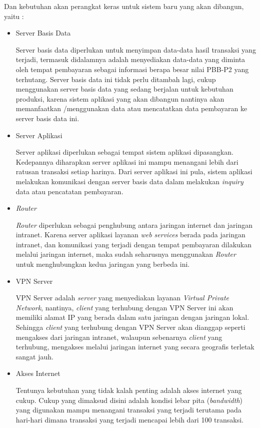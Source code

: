 \documentclass[pdftex, 12pt, oneside]{article}
\begin{document}
Dan kebutuhan akan perangkat keras untuk sistem baru yang akan dibangun, yaitu :

\begin{itemize}
  \item Server Basis Data
  
  Server basis data diperlukan untuk menyimpan data-data hasil transaksi yang terjadi, termasuk didalamnya adalah menyediakan data-data yang diminta oleh tempat pembayaran sebagai informasi berapa besar nilai PBB-P2 yang terhutang. Server basis data ini tidak perlu ditambah lagi, cukup menggunakan server basis data yang sedang berjalan untuk kebutuhan produksi, karena sistem aplikasi yang akan dibangun nantinya akan memanfaatkan /menggunakan data atau mencatatkan data pembayaran ke server basis data ini.
  
  \item Server Aplikasi
  
  Server aplikasi diperlukan sebagai tempat sistem aplikasi dipasangkan. Kedepannya diharapkan server aplikasi ini mampu menangani lebih dari ratusan transaksi setiap harinya. Dari server aplikasi ini pula, sistem aplikasi melakukan komunikasi dengan server basis data dalam melakukan \textit{inquiry} data atau pencatatan pembayaran.
  
  \item \textit{Router}
  
  \textit{Router} diperlukan sebagai penghubung antara jaringan internet dan jaringan intranet. Karena server aplikasi layanan \textit{web services} berada pada jaringan intranet, dan komunikasi yang terjadi dengan tempat pembayaran dilakukan melalui jaringan internet, maka sudah seharusnya menggunakan \textit{Router} untuk menghubungkan kedua jaringan yang berbeda ini.
  
  \item VPN Server
  
  VPN Server adalah \textit{server} yang menyediakan layanan \textit{Virtual Private Network}, nantinya, \textit{client} yang terhubung dengan VPN Server ini akan memiliki alamat IP yang berada dalam satu jaringan dengan jaringan lokal. Sehingga \textit{client} yang terhubung dengan VPN Server akan dianggap seperti mengakses dari jaringan intranet, walaupun sebenarnya \textit{client} yang terhubung, mengakses melalui jaringan internet yang secara geografis terletak sangat jauh.
  
  \item Akses Internet
  
  Tentunya kebutuhan yang tidak kalah penting adalah akses internet yang cukup. Cukup yang dimaksud disini adalah kondisi lebar pita (\textit{bandwidth}) yang digunakan mampu menangani transaksi yang terjadi terutama pada hari-hari dimana transaksi yang terjadi mencapai lebih dari 100 transaksi. 
  

\end{itemize}
\end{document}
